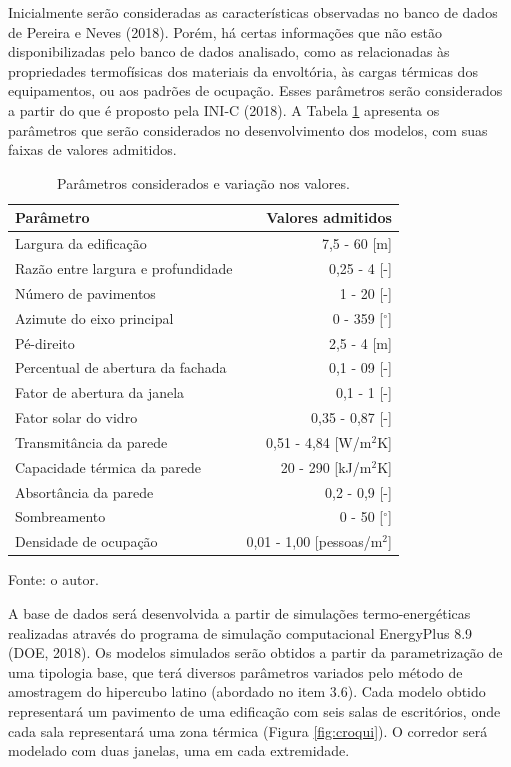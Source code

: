 \documentclass[brazil,hardcopy,openany,a5paper]{ufscthesis}
\begin{document}
		Inicialmente serão consideradas as características observadas no banco de dados de Pereira e Neves (2018). Porém, há certas informações que não estão disponibilizadas pelo banco de dados analisado, como as relacionadas às propriedades termofísicas dos materiais da envoltória, às cargas térmicas dos equipamentos, ou aos padrões de ocupação. Esses parâmetros serão considerados a partir do que é proposto pela INI-C (2018). A Tabela \ref{table:parametros} apresenta os parâmetros que serão considerados no desenvolvimento dos modelos, com suas faixas de valores admitidos.	
		
		\begin{table}[!h]
			\centering
			\caption{Parâmetros considerados e variação nos valores.}
			\label{table:parametros}
			\begin{tabular}{|l |r |}
				\hline
				\textbf{Parâmetro} & \textbf{Valores admitidos} \\
				\hline
				Largura da edificação & 7,5 - 60 [m] \\
				\hline
				Razão entre largura e profundidade & 0,25 - 4 [-] \\
				\hline
				Número de pavimentos & 1 - 20 [-] \\
				\hline 
				Azimute do eixo principal & 0 - 359 [$^{\circ}$] \\
				\hline 
				Pé-direito & 2,5 - 4 [m] \\
				\hline 
				Percentual de abertura da fachada & 0,1 - 09 [-] \\
				\hline 
				Fator de abertura da janela & 0,1 - 1 [-] \\
				\hline 
				Fator solar do vidro & 0,35 - 0,87 [-] \\
				\hline 
				Transmitância da parede & 0,51 - 4,84 [W/m$^2$K] \\
				\hline 
				Capacidade térmica da parede & 20 - 290 [kJ/m$^2$K] \\
				\hline 
				Absortância da parede & 0,2 - 0,9 [-] \\
				\hline 
				Sombreamento & 0 - 50 [$^{\circ}$] \\
				\hline 
				Densidade de ocupação & 0,01 - 1,00 [pessoas/m$^2$] \\
				\hline 
			\end{tabular}
			\begin{flushleft}
				Fonte: o autor.
			\end{flushleft}				
		\end{table}

		A base de dados será desenvolvida a partir de simulações termo-energéticas realizadas através do programa de simulação computacional EnergyPlus 8.9 (DOE, 2018). Os modelos simulados serão obtidos a partir da parametrização de uma tipologia base, que terá diversos parâmetros variados pelo método de amostragem do hipercubo latino (abordado no item 3.6). Cada modelo obtido representará um pavimento de uma edificação com seis salas de escritórios, onde cada sala representará uma zona térmica (Figura \ref{fig:croqui}). O corredor será modelado com duas janelas, uma em cada extremidade.
		
\end{document}
